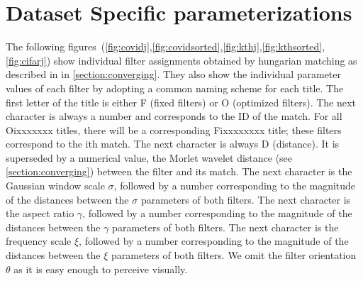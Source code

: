 \documentclass[10pt,twocolumn,letterpaper]{article}
\begin{document}
\section{Dataset Specific parameterizations}
\label{appendix-converging}

The following figures~(\ref{fig:covidj},\ref{fig:covidsorted},\ref{fig:kthj},\ref{fig:kthsorted},\ref{fig:cifarj}) show individual filter assignments obtained by hungarian matching as described in in \ref{section:converging}. They also show the individual parameter values of each filter by adopting a common naming scheme for each title. The first letter of the title is either F (fixed filters) or O (optimized filters). The next character is always a number and corresponds to the ID of the match. For all Oixxxxxxx titles, there will be a corresponding Fixxxxxxxx title; these filters correspond to the ith match. The next character is always D (distance). It is superseded by a numerical value, the Morlet wavelet distance (see \ref{section:converging}) between the filter and its match. The next character is the Gaussian window scale $\sigma$, followed by a number corresponding to the magnitude of the distances between the $\sigma$ parameters of both filters. The next character is the aspect ratio $\gamma$, followed by a number corresponding to the magnitude of the distances between the $\gamma$ parameters of both filters. The next character is the frequency scale $\xi$, followed by a number corresponding to the magnitude of the distances between the $\xi$ parameters of both filters. We omit the filter orientation $\theta$ as it is easy enough to perceive visually.
\clearpage
\end{document}
